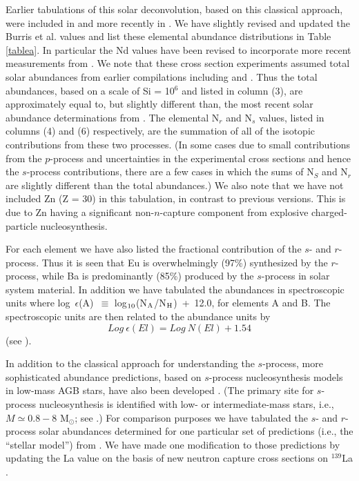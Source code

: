 \documentclass[12pt,preprint]{aastex}
\def\Msun{\mbox{M$_{\odot}$}}
\begin{document}
{Earlier tabulations of this solar deconvolution,  based on this classical approach, were included in \citet{Sneden1996}  and more recently in \citet{Burris2000}.  We have slightly revised and updated the Burris et al. values and list these elemental abundance distributions in Table \ref{tablea}.  In particular 
the Nd values have been  revised to incorporate more recent measurements from \citet{Wisshak1998}.  We note that these cross section experiments assumed total solar abundances from earlier compilations including \citet{Anders1982} and \citet{Anders1989}.   Thus the total abundances,  based on a scale of Si = 10$^6$  and listed in column (3), are approximately equal to, but slightly different than, the most recent solar abundance determinations from  \citet{Lodders2003}.  The elemental N$_r$ and N$_s$ values, listed in columns (4) and (6) respectively, are the summation of all of the isotopic contributions from these two processes. (In some cases due to small contributions from the $p$-process and uncertainties in the experimental cross sections and hence the $s$-process contributions, there are a few cases in which the sums of  N$_S$ and N$_r$ are slightly different than the total abundances.) We also note that we have not included Zn  (Z = 30) in  this tabulation, in contrast to previous versions. This is due to  Zn having a significant non-$n$-capture component from explosive charged-particle nucleosynthesis. 
 
For each element we have also listed the fractional contribution of the $s$- and $r$-process. Thus it is seen that Eu is overwhelmingly (97\%) synthesized by the $r$-process, while Ba is predominantly (85\%) produced by the $s$-process in solar system material.  In addition we have tabulated  the abundances in spectroscopic units where 
log~$\epsilon$(A)~$\equiv$ log$_{\rm 10}$(N$_{\rm A}$/N$_{\rm H}$)~+~12.0, for elements A and B.  The spectroscopic units are then related to the abundance units by
$$ Log \ \epsilon(El)  = Log \ N(El) + 1.54 $$ (see \citealt{Lodders2003}). 

In addition to the classical approach for understanding the $s$-process, more sophisticated abundance predictions, based on $s$-process nucleosynthesis models in low-mass AGB stars, have also been developed \citep{Arlandini1999}.  (The primary site for $s$-process nucleosynthesis is identified with  low- or intermediate-mass stars, i.e., $M \simeq 0.8-8$ \Msun; see \citealt{Busso1999}.)  For comparison purposes we have tabulated the $s$- and $r$-process solar abundances determined for one particular set of predictions (i.e., the ``stellar model'') from \citet{Arlandini1999}.  We have made one modification to those predictions by  updating the La value on the basis of new neutron capture cross sections on $^{139}$La \citep{OBrien2003}. 

}
\end{document}
